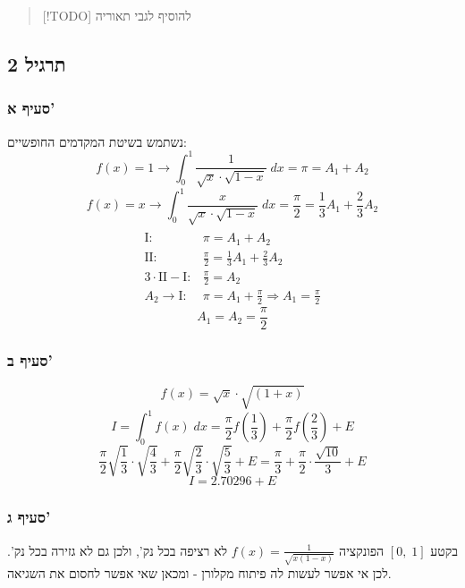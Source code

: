 \documentclass[
  a4paper,
]{article}
\begin{document}
\begin{quote}
{[}!TODO{]} להוסיף לגבי תאוריה
\end{quote}

\subsection{תרגיל 2}\label{ux5eaux5e8ux5d2ux5d9ux5dc-2}

\subsubsection{סעיף א'}\label{ux5e1ux5e2ux5d9ux5e3-ux5d0}

נשתמש בשיטת המקדמים החופשיים:
\[f(x)=1\longrightarrow \int_{0}^{1} \frac{1}{\sqrt{x} \cdot \sqrt{1-x}} \; dx=\pi=A_{1}+A_{2}\]
\[f(x)=x\longrightarrow \int_{0}^{1} \frac{x}{\sqrt{x} \cdot \sqrt{1-x}} \; dx=\frac{\pi}{2}=\frac{1}{3}A_{1}+\frac{2}{3}A_{2} \]
\[\begin{array}{rl} \\
\mathrm{I} :&\pi=A_{1}+A_{2} \\
\mathrm{II} :&\frac{\pi}{2}=\frac{1}{3}A_{1}+\frac{2}{3}A_{2} \\
3\cdot \mathrm{II} -\mathrm{I} :&\frac{\pi}{2}=A_{2} \\
A_{2}\to \mathrm{I} :& \pi=A_{1}+\frac{\pi}{2}\Longrightarrow A_{1}=\frac{\pi}{2}
\end{array}\] \[\boxed{A_{1}=A_{2}=\frac{\pi}{2}}\]

\subsubsection{סעיף ב'}\label{ux5e1ux5e2ux5d9ux5e3-ux5d1-1}

\[f(x)=\sqrt{x}\cdot \sqrt{(1+x)}\]
\[I=\int_{0}^{1} f(x) \; dx =\frac{\pi}{2}f\left( \frac{1}{3} \right)+\frac{\pi}{2}f\left( \frac{2}{3} \right)+E\]
\[\frac{\pi}{2}\sqrt{\frac{1}{3}}\cdot \sqrt{\frac{4}{3}}+\frac{\pi}{2}\sqrt{\frac{2}{3}}\cdot \sqrt{\frac{5}{3}}+E=\frac{\pi}{3}+\frac{\pi}{2}\cdot \frac{\sqrt{10}}{3}+E\]
\[\boxed{I=2.70296+E}\]

\subsubsection{סעיף ג'}\label{ux5e1ux5e2ux5d9ux5e3-ux5d2}

בקטע \([0,\;1]\) הפונקציה \(f(x)=\frac{1}{\sqrt{x(1-x)}}\) לא רציפה בכל
נק', ולכן גם לא גזירה בכל נק'. לכן אי אפשר לעשות לה פיתוח מקלורן - ומכאן
שאי אפשר לחסום את השגיאה.
\end{document}
